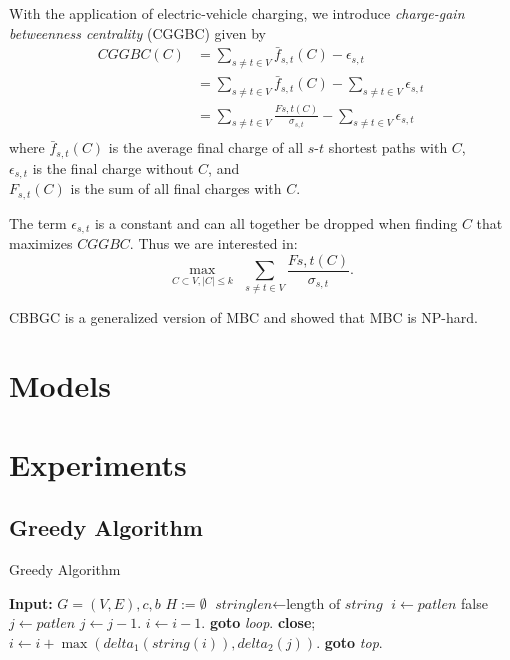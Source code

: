 \documentclass[envcountsame]{llncs}
\begin{document}
	With the application of electric-vehicle charging, we introduce \emph{charge-gain betweenness centrality} (CGGBC) given by
	\begin{align*}
		CGGBC(C) &= \sum_{s \neq t \in V}\bar{f}_{s,t}(C) - \epsilon_{s,t}\\
		&=  \sum_{s \neq t \in V}\bar{f}_{s,t}(C) - \sum_{s \neq t \in V} \epsilon_{s,t}\\
		&= \sum_{s \neq t \in V}\frac{F{s,t}(C)}{\sigma_{s,t}} - \sum_{s \neq t \in V} \epsilon_{s,t}\\
	\end{align*}
	where $\bar{f}_{s,t}(C) $ is the average final charge of all $s$-$t$ shortest paths with $C$,\\ $\epsilon_{s,t}$ is the final charge without $C$, and \\
	$F_{s,t}(C)$ is the sum of all final charges with $C$.
	
	\noindent The term $\epsilon_{s,t}$ is a constant and can all together be dropped when finding $C$ that maximizes $CGGBC$. Thus we are interested in:
	\begin{equation}
	\max_{C \subset V, |C| \leq k} \ \ \sum_{s \neq t \in V}\frac{F{s,t}(C)}{\sigma_{s,t}}.
	\end{equation}
	
	\noindent CBBGC is a generalized version of MBC and  \cite{puzis2007finding} showed that MBC is NP-hard.
	\section{Models}
\section{Experiments}
	\subsection{Greedy Algorithm}
	\begin{algorithm}
		\caption{Greedy Algorithm}\label{euclid}
		
		\begin{algorithmic}[1]
			\State \textbf{Input:} $G = (V,E), c, b$
			\State $H := \emptyset$
			\State $\textit{stringlen} \gets \text{length of }\textit{string}$
			\State $i \gets \textit{patlen}$
			 \Return false
			\EndIf
			\State $j \gets \textit{patlen}$
			\State $j \gets j-1$.
			\State $i \gets i-1$.
			\State \textbf{goto} \emph{loop}.
			\State \textbf{close};
			\EndIf
			\State $i \gets i+\max(\textit{delta}_1(\textit{string}(i)),\textit{delta}_2(j))$.
			\State \textbf{goto} \emph{top}.
		\end{algorithmic}
	\end{algorithm}
\end{document}
